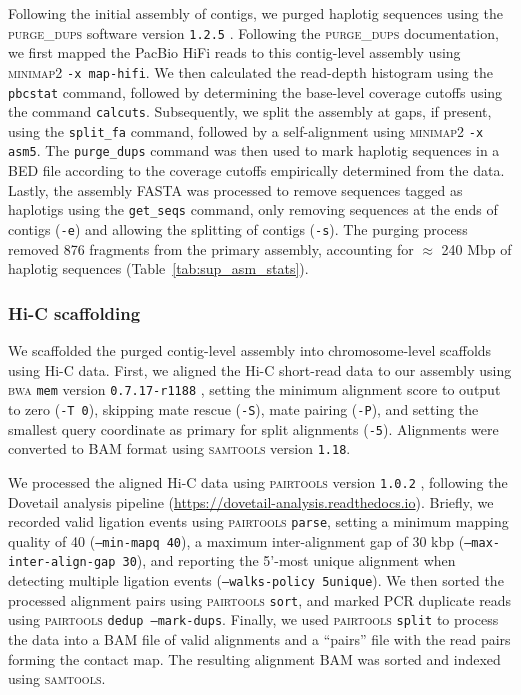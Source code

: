 \documentclass[11pt]{article}
\begin{document}
Following the initial assembly of contigs, we purged haplotig sequences using the
\textsc{purge\_dups} software version \texttt{1.2.5} \citep{guan_identifying_2020}.
Following the \textsc{purge\_dups} documentation, we first mapped the PacBio HiFi
reads to this contig-level assembly using \textsc{minimap2} \texttt{-x map-hifi}.
We then calculated the read-depth histogram using the \texttt{pbcstat} command,
followed by determining the base-level coverage cutoffs using the command
\texttt{calcuts}. Subsequently, we split the assembly at gaps, if present, using
the \texttt{split\_fa} command, followed by a self-alignment using \textsc{minimap2}
\texttt{-x asm5}. The \texttt{purge\_dups} command was then used to mark haplotig
sequences in a BED file according to the coverage cutoffs empirically determined
from the data. Lastly, the assembly FASTA was processed to remove sequences tagged
as haplotigs using the \texttt{get\_seqs} command, only removing sequences at the
ends of contigs (\texttt{-e}) and allowing the splitting of contigs (\texttt{-s}).
The purging process removed 876 fragments from the primary assembly, accounting for
$\approx$ 240 Mbp of haplotig sequences (Table~\ref{tab:sup_asm_stats}).

\subsubsection*{Hi-C scaffolding}

We scaffolded the purged contig-level assembly into chromosome-level scaffolds using
Hi-C data. First, we aligned the Hi-C short-read data to our assembly using
\textsc{bwa} \texttt{mem} version \texttt{0.7.17-r1188} \citep{li_aligning_2013},
setting the minimum alignment score to output to zero (\texttt{-T 0}), skipping mate
rescue (\texttt{-S}), mate pairing (\texttt{-P}), and setting the smallest query
coordinate as primary for split alignments (\texttt{-5}). Alignments were converted
to BAM format using \textsc{samtools} version \texttt{1.18}.
\vspace{0.2cm}

We processed the aligned Hi-C data using \textsc{pairtools} version \texttt{1.0.2}
\citep{open2c_pairtools_2023}, following the Dovetail analysis pipeline
(\url{https://dovetail-analysis.readthedocs.io}). Briefly, we recorded valid ligation
events using \textsc{pairtools} \texttt{parse}, setting a minimum mapping quality of
40 (\texttt{--min-mapq 40}), a maximum inter-alignment gap of 30 kbp
(\texttt{--max-inter-align-gap 30}), and reporting the 5'-most unique alignment when
detecting multiple ligation events (\texttt{--walks-policy 5unique}). We then sorted
the processed alignment pairs using \textsc{pairtools} \texttt{sort}, and marked PCR
duplicate reads using \textsc{pairtools} \texttt{dedup --mark-dups}. Finally, we used
\textsc{pairtools} \texttt{split} to process the data into a BAM file of valid
alignments and a ``pairs'' file with the read pairs forming the contact map. The
resulting alignment BAM was sorted and indexed using \textsc{samtools}.
\vspace{0.2cm}
\end{document}
